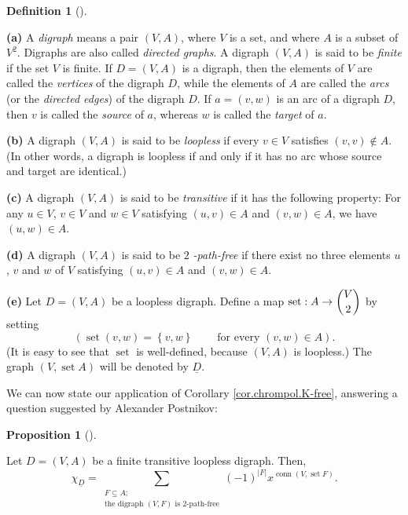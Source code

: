 \documentclass[numbers=enddot,12pt,final,onecolumn,notitlepage]{scrartcl}%
\theoremstyle{definition}
\newtheorem{prop}[theo]{Proposition}
\newenvironment{proposition}[1][]
{\begin{prop}[#1]\begin{leftbar}}
{\end{leftbar}\end{prop}}
\newtheorem{defi}[theo]{Definition}
\newenvironment{definition}[1][]
{\begin{defi}[#1]\begin{leftbar}}
{\end{leftbar}\end{defi}}
\let\sumnonlimits\sum
\renewcommand{\sum}{\sumnonlimits\limits}
\begin{document}
\begin{definition}
\label{def.digraph}\textbf{(a)} A \textit{digraph} means a pair $\left(
V,A\right)  $, where $V$ is a set, and where $A$ is a subset of $V^{2}$.
Digraphs are also called \textit{directed graphs}. A digraph $\left(
V,A\right)  $ is said to be \textit{finite} if the set $V$ is finite. If
$D=\left(  V,A\right)  $ is a digraph, then the elements of $V$ are called the
\textit{vertices} of the digraph $D$, while the elements of $A$ are called the
\textit{arcs} (or the \textit{directed edges}) of the digraph $D$. If
$a=\left(  v,w\right)  $ is an arc of a digraph $D$, then $v$ is called the
\textit{source} of $a$, whereas $w$ is called the \textit{target} of $a$.

\textbf{(b)} A digraph $\left(  V,A\right)  $ is said to be \textit{loopless}
if every $v\in V$ satisfies $\left(  v,v\right)  \notin A$. (In other words, a
digraph is loopless if and only if it has no arc whose source and target are identical.)

\textbf{(c)} A digraph $\left(  V,A\right)  $ is said to be
\textit{transitive} if it has the following property: For any $u\in V$, $v\in
V$ and $w\in V$ satisfying $\left(  u,v\right)  \in A$ and $\left(
v,w\right)  \in A$, we have $\left(  u,w\right)  \in A$.

\textbf{(d)} A digraph $\left(  V,A\right)  $ is said to be $2$%
\textit{-path-free} if there exist no three elements $u$, $v$ and $w$ of $V$
satisfying $\left(  u,v\right)  \in A$ and $\left(  v,w\right)  \in A$.

\textbf{(e)} Let $D=\left(  V,A\right)  $ be a loopless digraph. Define a map
$\operatorname*{set}:A\rightarrow\dbinom{V}{2}$ by setting%
\[
\left(  \operatorname*{set}\left(  v,w\right)  =\left\{  v,w\right\}
\ \ \ \ \ \ \ \ \ \ \text{for every }\left(  v,w\right)  \in A\right)  .
\]
(It is easy to see that $\operatorname*{set}$ is well-defined, because
$\left(  V,A\right)  $ is loopless.) The graph $\left(  V,\operatorname*{set}%
A\right)  $ will be denoted by $\underline{D}$.
\end{definition}

We can now state our application of Corollary \ref{cor.chrompol.K-free},
answering a question suggested by Alexander Postnikov:

\begin{proposition}
\label{prop.digraph.2pf-chrom}Let $D=\left(  V,A\right)  $ be a finite
transitive loopless digraph. Then,%
\[
\chi_{\underline{D}}=\sum_{\substack{F\subseteq A;\\\text{the digraph }\left(
V,F\right)  \text{ is }2\text{-path-free}}}\left(  -1\right)  ^{\left\vert
F\right\vert }x^{\operatorname*{conn}\left(  V,\operatorname*{set}F\right)
}.
\]

\end{proposition}
\end{document}
